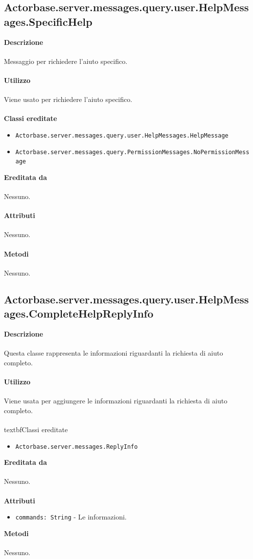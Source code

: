 \documentclass[a4paper]{article}
\begin{document}
	\subsection{Actorbase.server.messages.query.user.HelpMessages.SpecificHelp}
		\textbf{Descrizione}
			\\ \\
			Messaggio per richiedere l'aiuto specifico.
			\\ \\
		\textbf{Utilizzo}
			\\ \\
			Viene usato per richiedere l'aiuto specifico.
			\\ \\
		\textbf{Classi ereditate}
			\begin{itemize}
				\item \texttt{Actorbase.server.messages.query.user.HelpMessages.HelpMessage}
				\item \texttt{Actorbase.server.messages.query.PermissionMessages.NoPermissionMessage}
			\end{itemize}
		\textbf{Ereditata da}
			\\ \\
			Nessuno.
			\\ \\
		\textbf{Attributi}
			\\ \\
			Nessuno.
			\\ \\
		\textbf{Metodi}
			\\ \\
			Nessuno.
			
	\subsection{Actorbase.server.messages.query.user.HelpMessages.CompleteHelpReplyInfo}
		\textbf{Descrizione}
			\\ \\
			Questa classe rappresenta le informazioni riguardanti la richiesta di aiuto completo.
			\\ \\
		\textbf{Utilizzo}
			\\ \\
			Viene usata per aggiungere le informazioni riguardanti la richiesta di aiuto completo.
			\\ \\
		textbf{Classi ereditate}
			\begin{itemize}
				\item \texttt{Actorbase.server.messages.ReplyInfo}
			\end{itemize}
		\textbf{Ereditata da}
			\\ \\
			Nessuno.
			\\ \\
		\textbf{Attributi}
			\begin{itemize}
				\item \texttt{commands: String} - Le informazioni.
			\end{itemize}
		\textbf{Metodi}
			\\ \\
			Nessuno.
\end{document}
